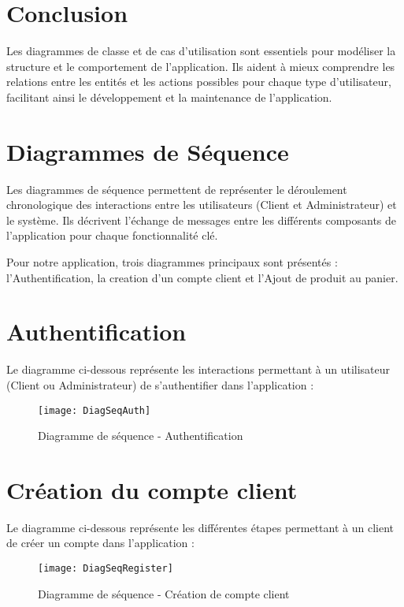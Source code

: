 \section*{Conclusion}
Les diagrammes de classe et de cas d'utilisation sont essentiels pour modéliser la structure et le comportement de l'application. Ils aident à mieux comprendre les relations entre les entités et les actions possibles pour chaque type d'utilisateur, facilitant ainsi le développement et la maintenance de l'application.



\section{Diagrammes de Séquence}

Les diagrammes de séquence permettent de représenter le déroulement chronologique des interactions entre les utilisateurs (Client et Administrateur) et le système. Ils décrivent l’échange de messages entre les différents composants de l'application pour chaque fonctionnalité clé.

Pour notre application, trois diagrammes principaux sont présentés : l'Authentification, la creation d'un compte client et l'Ajout de produit au panier.

\section*{Authentification}
Le diagramme ci-dessous représente les interactions permettant à un utilisateur (Client ou Administrateur) de s'authentifier dans l'application :

\begin{figure}[H]
    \centering
    \texttt{[image: DiagSeqAuth]}
    \caption{Diagramme de séquence - Authentification}
    \label{fig:seq_auth}
\end{figure}

\section*{Création du compte client}
Le diagramme ci-dessous représente les différentes étapes permettant à un client de créer un compte dans l'application :  
\begin{figure}[H]
    \centering
    \texttt{[image: DiagSeqRegister]}
    \caption{Diagramme de séquence - Création de compte client}
    \label{fig:seq_register}
\end{figure}

